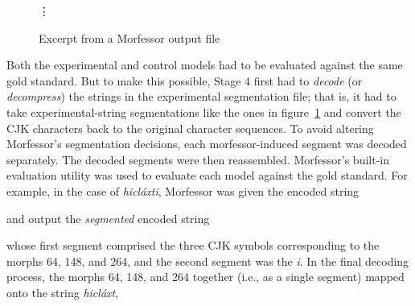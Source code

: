 {\begin{figure}[t]
\begin{mdframed}
\vdots
\caption{Excerpt from a Morfessor output file}
\label{fig:morfessor-output}
\end{mdframed}
\end{figure}
Both the experimental and control models had to be evaluated against the same gold standard.
But to make this possible, Stage 4 first had to \emph{decode} (or \emph{decompress}) the strings in the experimental segmentation file; that is, it had to take experimental-string segmentations like the ones in 
figure~\ref{fig:morfessor-output} and convert the CJK characters back to the original character sequences.
To avoid altering Morfessor’s segmentation decisions, 
each morfessor-induced segment 
was decoded separately. The decoded segments were then reassembled. 
Morfessor's built-in evaluation utility was used to evaluate each model against the gold standard. 
For example, 
in the case of \textit{hicl\'{a}xti}, %
Morfessor was given the encoded string 
\begin{center}
\end{center}
and output the \emph{segmented} encoded string
\begin{center}
\end{center}
whose first segment comprised the three  
CJK symbols corresponding to the morphs 64, 148, and 264, 
and the second segment was the \emph{i}. In the final decoding process, 
the morphs 64, 148, and 264 together (i.e., as a single segment) mapped onto the string \textit{hicl\'{a}xt}, 
}
